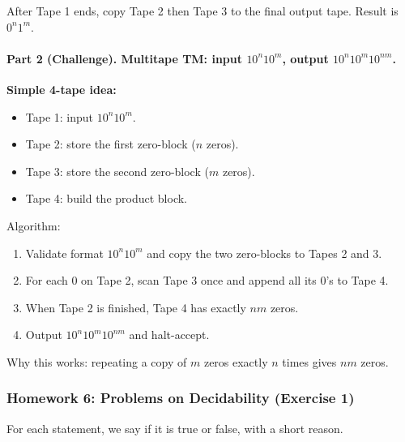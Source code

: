 \documentclass{article}
\theoremstyle{theorem}
\theoremstyle{definition}
\theoremstyle{remark}
\begin{document}
After Tape 1 ends, copy Tape 2 then Tape 3 to the final output tape. Result is $0^n1^m$.

\paragraph{Part 2 (Challenge). Multitape TM: input $10^n10^m$, output $10^n10^m10^{nm}$.}

\textbf{Simple 4-tape idea:}
\begin{itemize}
  \item Tape 1: input $10^n10^m$.
  \item Tape 2: store the first zero-block ($n$ zeros).
  \item Tape 3: store the second zero-block ($m$ zeros).
  \item Tape 4: build the product block.
\end{itemize}

Algorithm:
\begin{enumerate}
  \item Validate format $10^n10^m$ and copy the two zero-blocks to Tapes 2 and 3.
  \item For each $0$ on Tape 2, scan Tape 3 once and append all its $0$'s to Tape 4.
  \item When Tape 2 is finished, Tape 4 has exactly $nm$ zeros.
  \item Output $10^n10^m10^{nm}$ and halt-accept.
\end{enumerate}

Why this works: repeating a copy of $m$ zeros exactly $n$ times gives $nm$ zeros.

\subsubsection{Homework 6: Problems on Decidability (Exercise 1)}

For each statement, we say if it is true or false, with a short reason.
\end{document}
